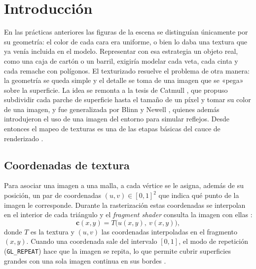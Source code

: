
\section{Introducción}

En las prácticas anteriores las figuras de la escena se distinguían únicamente por su geometría: el color de cada cara era uniforme, o bien lo daba una textura que ya venía incluida en el modelo. Representar con esa estrategia un objeto real, como una caja de cartón o un barril, exigiría modelar cada veta, cada cinta y cada remache con polígonos. El texturizado resuelve el problema de otra manera: la geometría se queda simple y el detalle se toma de una imagen que se «pega» sobre la superficie. La idea se remonta a la tesis de Catmull \cite{catmull1974}, que propuso subdividir cada parche de superficie hasta el tamaño de un píxel y tomar su color de una imagen, y fue generalizada por Blinn y Newell \cite{blinn1976}, quienes además introdujeron el uso de una imagen del entorno para simular reflejos. Desde entonces el mapeo de texturas es una de las etapas básicas del cauce de renderizado \cite{hearn_baker, akenine2018}.

\subsection*{Coordenadas de textura}
Para asociar una imagen a una malla, a cada vértice se le asigna, además de su posición, un par de coordenadas $(u, v) \in [0, 1]^2$ que indica qué punto de la imagen le corresponde. Durante la rasterización estas coordenadas se interpolan en el interior de cada triángulo y el \textit{fragment shader} consulta la imagen con ellas \cite{learnopengl}:
\begin{equation}
    \mathbf{c}(x, y) = T\big(u(x, y),\ v(x, y)\big),
\end{equation}
donde $T$ es la textura y $(u, v)$ las coordenadas interpoladas en el fragmento $(x, y)$. Cuando una coordenada sale del intervalo $[0, 1]$, el modo de repetición (\texttt{GL\_REPEAT}) hace que la imagen se repita, lo que permite cubrir superficies grandes con una sola imagen continua en sus bordes \cite{khronos_opengl}.

